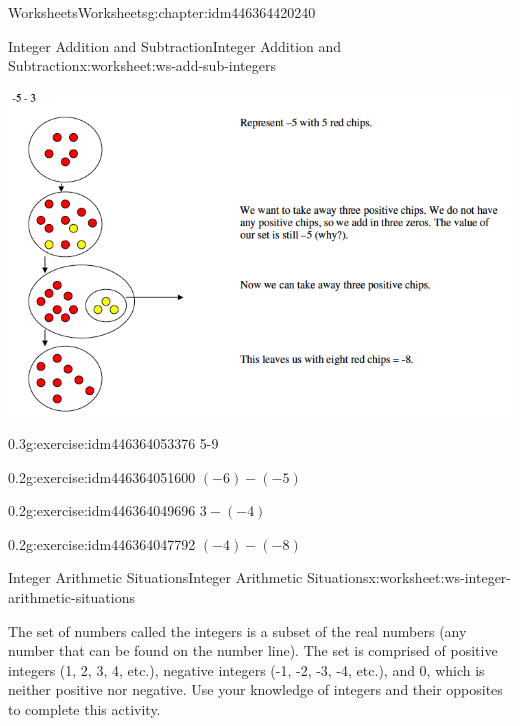 \documentclass[twoside,11pt,]{book}
\begin{document}
\begin{chapterptx}{Worksheets}{}{Worksheets}{}{}{g:chapter:idm446364420240}
\begin{worksheet-section-numberless}{Integer Addition and Subtraction}{}{Integer Addition and Subtraction}{}{}{x:worksheet:ws-add-sub-integers}
\begin{introduction}{}
\begin{sidebyside}{1}{0}{0}{0}
\begin{sbspanel}{1}
\includegraphics[width=1\linewidth]{images/integer-sub-model.png}
\end{sbspanel}%
\end{sidebyside}%
%
\end{introduction}%
\begin{divisionexercise}{5}{}{0.3}{g:exercise:idm446364053376}%
5-9%
\end{divisionexercise}%
\clearpage
\begin{divisionexercise}{6}{}{0.2}{g:exercise:idm446364051600}%
\((-6)-(-5) \)%
\end{divisionexercise}%
\begin{divisionexercise}{7}{}{0.2}{g:exercise:idm446364049696}%
\(3-(-4) \)%
\end{divisionexercise}%
\begin{divisionexercise}{8}{}{0.2}{g:exercise:idm446364047792}%
\((-4)-(-8) \)%
\end{divisionexercise}%
\end{worksheet-section-numberless}
\restoregeometry
%
%
\typeout{************************************************}
\typeout{************************************************}
%
\begin{worksheet-section-numberless}{Integer Arithmetic Situations}{}{Integer Arithmetic Situations}{}{}{x:worksheet:ws-integer-arithmetic-situations}
\begin{introduction}{}%
The set of numbers called the integers is a subset of the real numbers (any number that can be found on the number line).  The set is comprised of positive integers (1, 2, 3, 4, etc.), negative integers (-1, -2, -3, -4, etc.), and 0, which is neither positive nor negative.  Use your knowledge of integers and their opposites to complete this activity.%

\end{introduction}
\end{worksheet-section-numberless}
\end{chapterptx}
\end{document}
